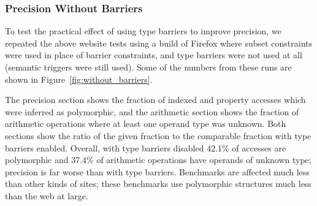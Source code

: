 \subsubsection{Precision Without Barriers}
\label{sec:without_barriers}

To test the practical effect of using type barriers to improve precision,
we repeated the above website tests using a build of Firefox where
subset constraints were used in place of barrier constraints,
and type barriers were not used at all (semantic triggers were still used).
Some of the numbers from these runs are shown in Figure~\ref{fig:without_barriers}.

The precision section shows the fraction of indexed and property accesses which
were inferred as polymorphic, and the arithmetic section shows the fraction
of arithmetic operations where at least one operand type was unknown.
Both sections show the ratio of the given fraction to the comparable fraction
with type barriers enabled.
Overall, with type barriers disabled 42.1\% of accesses are polymorphic and 37.4\%
of arithmetic operations have operands of unknown type; precision is far worse
than with type barriers.
Benchmarks are affected much less than other kinds of sites;
these benchmarks use polymorphic structures much less
than the web at large.

